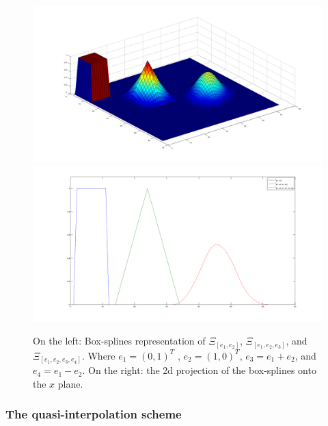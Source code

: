 \documentclass[proc]{edpsmath}
\begin{document}
\begin{figure}[h!]
	\includegraphics[scale=0.15]{figures/boxsplines3d.png}
	\includegraphics[scale=0.15]{figures/boxsplines2d.png}
	\caption{On the left: Box-splines representation of $\Xi_[e_1, e_2]$, $\Xi_[e_1, e_2, e_3]$, and $\Xi_[e_1, e_2, e_3, e_4]$. Where $e_1 = ( 0, 1 )^T$ , $e_2 = ( 1, 0)^T$, $e_3 = e_1 + e_2$, and $e_4 = e_1 - e_2$. On the right: the 2d projection of the box-splines onto the $x$ plane.}
	\label{fig:boxsplines3d}
\end{figure}

	


\subsubsection{The quasi-interpolation scheme}
\end{document}
